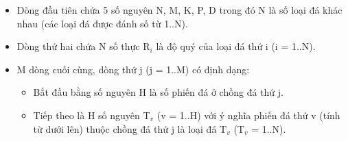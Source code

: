 \begin{itemize}
	\item Dòng đầu tiên chứa 5 số nguyên N, M, K, P, D trong đó N là số loại đá khác nhau (các loại đá được đánh số từ 1..N).
	\item Dòng thứ hai chứa N số thực R$_i$ là độ quý của loại đá thứ i (i = 1..N).
	\item M dòng cuối cùng, dòng thứ j (j = 1..M) có định dạng:                       

 
\begin{itemize}
	\item Bắt đầu bằng số nguyên H là số phiến đá ở chồng đá thứ j.
	\item Tiếp theo là H số nguyên T$_v$ (v = 1..H) với ý nghĩa phiến đá thứ v (tính từ dưới lên) thuộc chồng đá thứ j là loại đá T$_v$ (T$_v$ = 1..N).
\end{itemize}
\end{itemize}